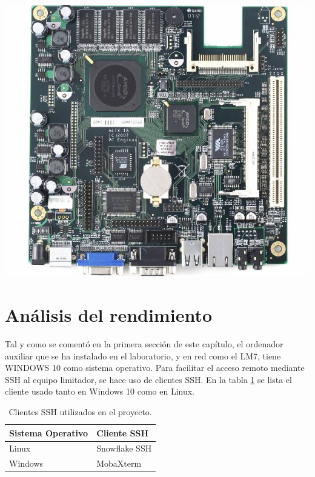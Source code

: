 \begin{center}
    \includegraphics[scale=0.75]{imagenes/alix1b.jpg}
    \label{img:alix1b}
\end{center}

\section{Análisis del rendimiento} \label{sec:lms7-performance}

Tal y como se comentó en la primera sección de este capítulo, el ordenador auxiliar que se ha instalado en el laboratorio, y en red como el \gls{LM7}, tiene \gls{WINDOWS} 10 como sistema operativo. Para facilitar el acceso remoto mediante \acrshort{SSH} al equipo limitador, se hace uso de clientes \acrshort{SSH}. En la tabla \ref{tab:gestoresSSH} se lista el cliente usado tanto en Windows 10 como en Linux.

\begin{table}[h]
    \centering
    \begin{tabular}{|l|l|}
        \hline
        \rowcolor[HTML]{ECF4FF}
        Sistema Operativo & Cliente SSH   \\ \hline
        Linux             & Snowflake SSH \\ \hline
        Windows           & MobaXterm     \\ \hline
    \end{tabular}
    \caption{Clientes \acrshort{SSH} utilizados en el proyecto.}
    \label{tab:gestoresSSH}
\end{table}


